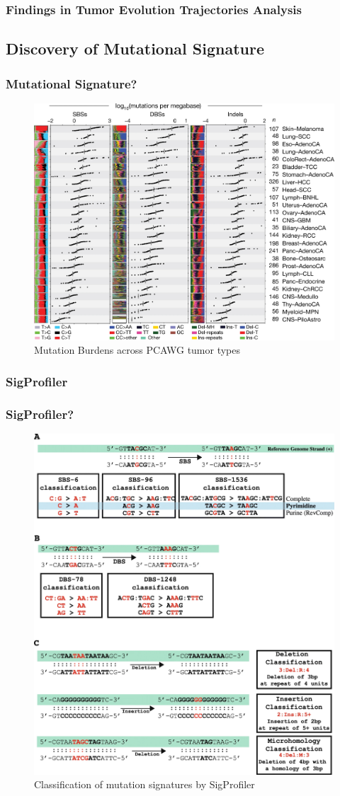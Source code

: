 \documentclass{beamer}
\begin{document}
    \begin{frame}
        \frametitle{Findings in Tumor Evolution Trajectories Analysis}
    \end{frame}

        \subsection{Discovery of Mutational Signature}
    \begin{frame}
        \frametitle{Mutational Signature?}

        \begin{figure}
            \includegraphics[width=0.6 \linewidth]{figures/LungCancer/signatures.jpg}
            \caption{Mutation Burdens across PCAWG tumor types \protect\cite{signature1}}
        \end{figure}
    \end{frame}

    \subsubsection{SigProfiler}
    \begin{frame}
        \frametitle{SigProfiler?}

        \begin{figure}
            \includegraphics[width=0.4 \linewidth]{figures/Workflow/SigProfiler.jpg}
            \caption{Classification of mutation signatures by SigProfiler \protect\cite{SigProfiler1, SigProfiler2, SigProfiler3}}
        \end{figure}
    \end{frame}
\end{document}
